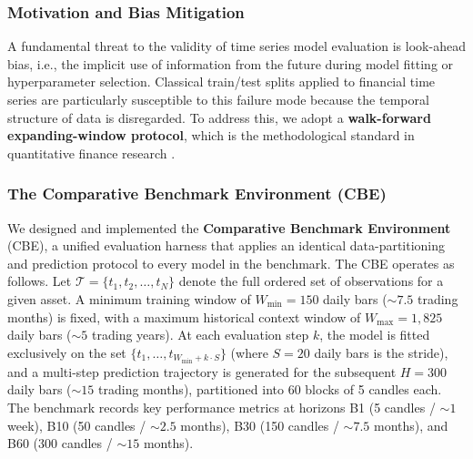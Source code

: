 \documentclass[11pt,a4paper]{article}
\begin{document}
\subsubsection{Motivation and Bias Mitigation}
A fundamental threat to the validity of time series model evaluation is look-ahead bias, i.e., the implicit use of information from the future during model fitting or hyperparameter selection. Classical train/test splits applied to financial time series are particularly susceptible to this failure mode because the temporal structure of data is disregarded. To address this, we adopt a \textbf{walk-forward expanding-window protocol}, which is the methodological standard in quantitative finance research \cite{lopez2018advances}.

\subsubsection{The Comparative Benchmark Environment (CBE)}
We designed and implemented the \textbf{Comparative Benchmark Environment} (CBE), a unified evaluation harness that applies an identical data-partitioning and prediction protocol to every model in the benchmark. The CBE operates as follows. Let $\mathcal{T} = \{t_1, t_2, \ldots, t_N\}$ denote the full ordered set of observations for a given asset. A minimum training window of $W_{\min} = 150$ daily bars ($\sim 7.5$ trading months) is fixed, with a maximum historical context window of $W_{\max} = 1,825$ daily bars ($\sim 5$ trading years). At each evaluation step $k$, the model is fitted exclusively on the set $\{t_1, \ldots, t_{W_{\min} + k \cdot S}\}$ (where $S = 20$ daily bars is the stride), and a multi-step prediction trajectory is generated for the subsequent $H = 300$ daily bars ($\sim 15$ trading months), partitioned into 60 blocks of 5 candles each. The benchmark records key performance metrics at horizons B1 (5 candles / $\sim 1$ week), B10 (50 candles / $\sim 2.5$ months), B30 (150 candles / $\sim 7.5$ months), and B60 (300 candles / $\sim 15$ months).
\end{document}

